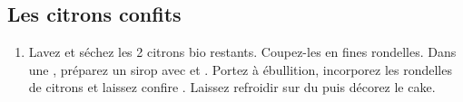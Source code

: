 \subsection*{Les citrons confits}

\begin{enumerate}
\item Lavez et séchez les 2 citrons bio restants. Coupez-les en fines rondelles. Dans une , préparez un sirop avec  et . Portez à ébullition, incorporez les rondelles de citrons et laissez confire . Laissez refroidir sur du  puis décorez le cake.
\end{enumerate}

